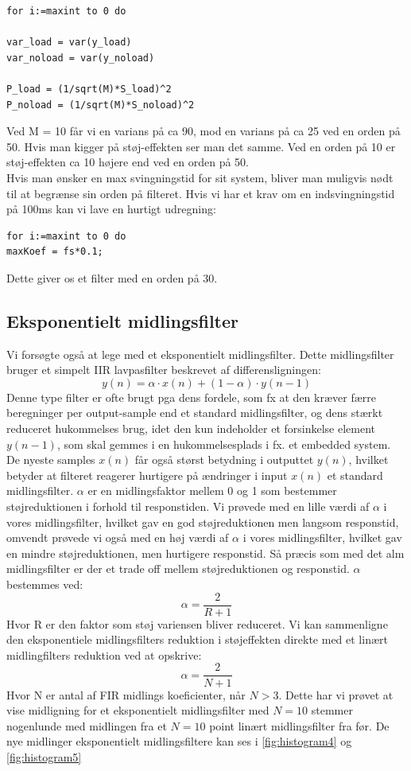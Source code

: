 \documentclass[12pt]{article}
\begin{document}
\begin{lstlisting}[frame=single]  % Start your code-block
for i:=maxint to 0 do

var_load = var(y_load)
var_noload = var(y_noload)

P_load = (1/sqrt(M)*S_load)^2
P_noload = (1/sqrt(M)*S_noload)^2
\end{lstlisting}

Ved M = 10 får vi en varians på ca 90, mod en varians på ca 25 ved en orden på 50. Hvis man kigger på støj-effekten ser man det samme. Ved en orden på 10 er støj-effekten ca 10 højere end ved en orden på 50.\\

Hvis man ønsker en max svingningstid for sit system, bliver man muligvis nødt til at begrænse sin orden på filteret. Hvis vi har et krav om en indsvingningstid på 100ms kan vi lave en hurtigt udregning:

\begin{lstlisting}[frame=single]  % Start your code-block
for i:=maxint to 0 do
maxKoef = fs*0.1;
\end{lstlisting}

Dette giver os et filter med en orden på 30. 
\newpage

\subsection{Eksponentielt midlingsfilter}
Vi forsøgte også at lege med et eksponentielt midlingsfilter. Dette midlingsfilter bruger et
simpelt IIR lavpasfilter beskrevet af differensligningen:
\[ y(n)= \alpha \cdot x(n)+(1-\alpha)\cdot y(n-1) \]
Denne type filter er ofte brugt pga dens fordele, som fx at den kræver færre beregninger per output-sample end et standard midlingsfilter, og dens stærkt reduceret hukommelses brug, idet den kun indeholder et forsinkelse element $y(n-1)$, som skal gemmes i en hukommelsesplads i fx. et embedded system. De nyeste samples $x(n)$ får også størst betydning i outputtet $y(n)$, hvilket betyder at filteret reagerer hurtigere på ændringer i input $x(n)$ et standard midlingsfilter. 
\newline
$\alpha$ er en midlingsfaktor mellem 0 og 1 som bestemmer støjreduktionen i forhold til responstiden. Vi prøvede med en lille værdi af $\alpha$ i vores midlingsfilter, hvilket gav en god støjreduktionen men langsom responstid, omvendt prøvede vi også med en høj værdi af $\alpha$ i vores midlingsfilter, hvilket gav en mindre støjreduktionen, men hurtigere responstid. Så præcis som med det alm midlingsfilter er der et trade off mellem støjreduktionen og responstid.
\newline
$\alpha$ bestemmes ved:
\[ \alpha = \dfrac{2}{R+1} \]
Hvor R er den faktor som støj variensen bliver reduceret. Vi kan sammenligne den eksponentiele midlingsfilters reduktion i støjeffekten direkte med et linært midlingfilters reduktion ved at opskrive:
\[ \alpha = \dfrac{2}{N+1}\]
Hvor N er antal af FIR midlings koeficienter, når $N>3$. Dette har vi prøvet at vise midligning for et eksponentielt midlingsfilter med $N=10$ stemmer nogenlunde med midlingen fra et $N=10$ point linært midlingsfilter fra før. De nye midlinger eksponentielt midlingsfiltere kan ses i \autoref{fig:histogram4} og \autoref{fig:histogram5}
\end{document}
